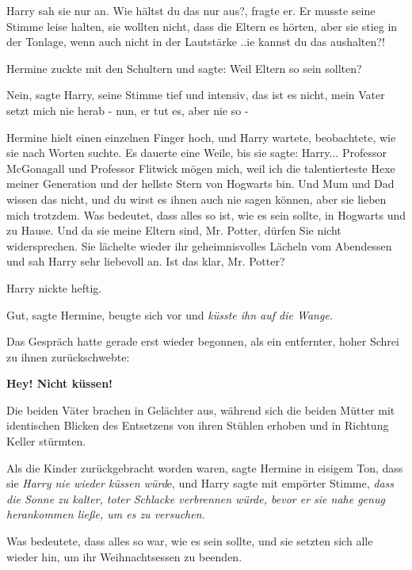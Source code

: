 Harry sah sie nur an. \glqq{}Wie hältst du das nur aus?\grqq{}, fragte er. Er
musste seine Stimme leise halten, sie wollten nicht, dass die Eltern es hörten,
aber sie stieg in der Tonlage, wenn auch nicht in der Lautstärke .\grqq{}.ie
kannst du das aushalten?!\grqq{}

Hermine zuckte mit den Schultern und sagte: \glqq{}Weil Eltern so sein sollten?\grqq{}

\glqq{}Nein\grqq{}, sagte Harry, seine Stimme tief und intensiv, \glqq{}das ist es
nicht, mein Vater setzt mich nie herab - nun, er tut es, aber nie so -\grqq{}

Hermine hielt einen einzelnen Finger hoch, und Harry wartete, beobachtete, wie
sie nach Worten suchte. Es dauerte eine Weile, bis sie sagte: \glqq{}Harry...
Professor McGonagall und Professor Flitwick mögen mich, weil ich die
talentierteste Hexe meiner Generation und der hellste Stern von Hogwarts bin.
Und Mum und Dad wissen das nicht, und du wirst es ihnen auch nie sagen können,
aber sie lieben mich trotzdem. Was bedeutet, dass alles so ist, wie es sein
sollte, in Hogwarts und zu Hause. Und da sie meine Eltern sind, Mr. Potter,
dürfen Sie nicht widersprechen.\grqq{} Sie lächelte wieder ihr geheimnisvolles Lächeln
vom Abendessen und sah Harry sehr liebevoll an. \glqq{}Ist das klar, Mr. Potter?\grqq{}

Harry nickte heftig.

\glqq{}Gut\grqq{}, sagte Hermine, beugte sich vor und \emph{küsste ihn auf die
Wange.}

Das Gespräch hatte gerade erst wieder begonnen, als ein entfernter, hoher Schrei
zu ihnen zurückschwebte:

\textbf{ \glqq{}Hey! Nicht küssen!\grqq{}}

Die beiden Väter brachen in Gelächter aus, während sich die beiden Mütter mit
identischen Blicken des Entsetzens von ihren Stühlen erhoben und in Richtung
Keller stürmten.

Als die Kinder zurückgebracht worden waren, sagte Hermine in eisigem Ton, dass
sie \emph{Harry nie wieder küssen würd}e, und Harry sagte mit empörter Stimme,
\emph{dass die Sonne zu kalter, toter Schlacke verbrennen würde, bevor er sie
nahe genug herankommen ließe, um es zu versuchen.}

Was bedeutete, dass alles so war, wie es sein sollte, und sie setzten sich alle
wieder hin, um ihr Weihnachtsessen zu beenden.

